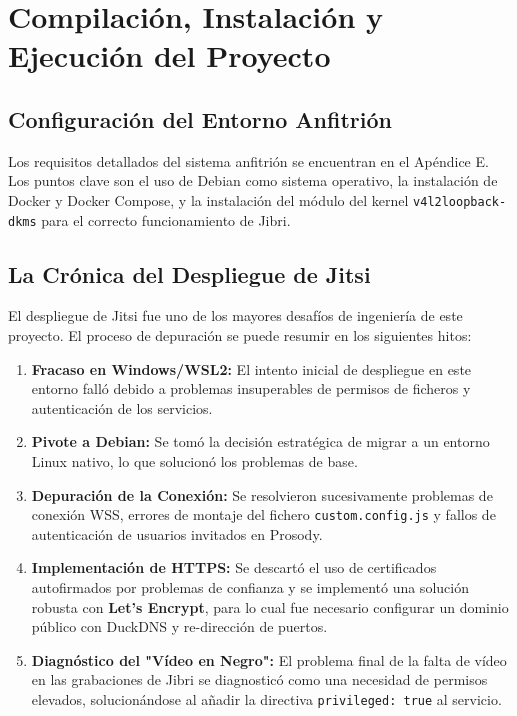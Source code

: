 \section{Compilación, Instalación y Ejecución del Proyecto}

\subsection{Configuración del Entorno Anfitrión}
Los requisitos detallados del sistema anfitrión se encuentran en el Apéndice E. Los puntos clave son el uso de Debian como sistema operativo, la instalación de Docker y Docker Compose, y la instalación del módulo del kernel \texttt{v4l2loopback-dkms} para el correcto funcionamiento de Jibri.

\subsection{La Crónica del Despliegue de Jitsi}
El despliegue de Jitsi fue uno de los mayores desafíos de ingeniería de este proyecto. El proceso de depuración se puede resumir en los siguientes hitos:
\begin{enumerate}
    \item \textbf{Fracaso en Windows/WSL2:} El intento inicial de despliegue en este entorno falló debido a problemas insuperables de permisos de ficheros y autenticación de los servicios.
    \item \textbf{Pivote a Debian:} Se tomó la decisión estratégica de migrar a un entorno Linux nativo, lo que solucionó los problemas de base.
    \item \textbf{Depuración de la Conexión:} Se resolvieron sucesivamente problemas de conexión WSS, errores de montaje del fichero \texttt{custom.config.js} y fallos de autenticación de usuarios invitados en Prosody.
    \item \textbf{Implementación de HTTPS:} Se descartó el uso de certificados autofirmados por problemas de confianza y se implementó una solución robusta con \textbf{Let's Encrypt}, para lo cual fue necesario configurar un dominio público con DuckDNS y re-dirección de puertos.
    \item \textbf{Diagnóstico del "Vídeo en Negro":} El problema final de la falta de vídeo en las grabaciones de Jibri se diagnosticó como una necesidad de permisos elevados, solucionándose al añadir la directiva \texttt{privileged: true} al servicio.
\end{enumerate}

